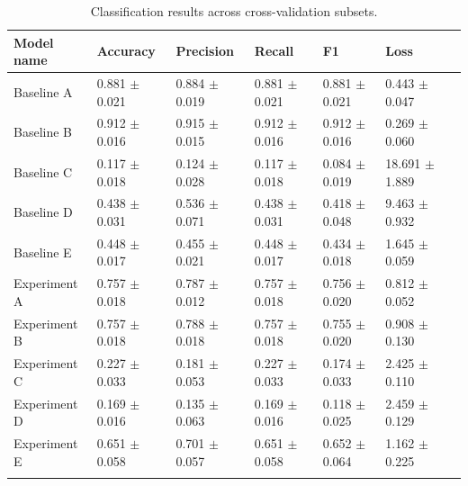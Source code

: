 \begin{table}[h]
\caption{Classification results across cross-validation subsets.}\label{tab:qnn_integration_results}%
\begin{tabular}{@{}lllllll@{}}
\toprule
Model name & Accuracy & Precision & Recall & F1 & Loss \\
\midrule
Baseline A & 0.881 $\pm$ 0.021 & 0.884 $\pm$ 0.019 & 0.881 $\pm$ 0.021 & 0.881 $\pm$ 0.021 & 0.443 $\pm$ 0.047 \\
Baseline B & 0.912 $\pm$ 0.016 & 0.915 $\pm$ 0.015 & 0.912 $\pm$ 0.016 & 0.912 $\pm$ 0.016 & 0.269 $\pm$ 0.060 \\
Baseline C & 0.117 $\pm$ 0.018 & 0.124 $\pm$ 0.028 & 0.117 $\pm$ 0.018 & 0.084 $\pm$ 0.019 & 18.691 $\pm$ 1.889 \\
Baseline D & 0.438 $\pm$ 0.031 & 0.536 $\pm$ 0.071 & 0.438 $\pm$ 0.031 & 0.418 $\pm$ 0.048 & 9.463 $\pm$ 0.932 \\
Baseline E & 0.448 $\pm$ 0.017 & 0.455 $\pm$ 0.021 & 0.448 $\pm$ 0.017 & 0.434 $\pm$ 0.018 & 1.645 $\pm$ 0.059 \\
Experiment A & 0.757 $\pm$ 0.018 & 0.787 $\pm$ 0.012 & 0.757 $\pm$ 0.018 & 0.756 $\pm$ 0.020 & 0.812 $\pm$ 0.052 \\
Experiment B & 0.757 $\pm$ 0.018 & 0.788 $\pm$ 0.018 & 0.757 $\pm$ 0.018 & 0.755 $\pm$ 0.020 & 0.908 $\pm$ 0.130 \\
Experiment C & 0.227 $\pm$ 0.033 & 0.181 $\pm$ 0.053 & 0.227 $\pm$ 0.033 & 0.174 $\pm$ 0.033 & 2.425 $\pm$ 0.110 \\
Experiment D & 0.169 $\pm$ 0.016 & 0.135 $\pm$ 0.063 & 0.169 $\pm$ 0.016 & 0.118 $\pm$ 0.025 & 2.459 $\pm$ 0.129 \\
Experiment E & 0.651 $\pm$ 0.058 & 0.701 $\pm$ 0.057 & 0.651 $\pm$ 0.058 & 0.652 $\pm$ 0.064 & 1.162 $\pm$ 0.225 \\
\botrule
\end{tabular}
\end{table}
